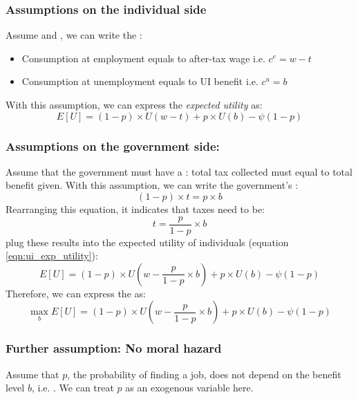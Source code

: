             \subsubsection{Assumptions on the individual side}
                Assume  and , we can write the :
                \begin{itemize}
                    \item Consumption at employment equals to after-tax wage i.e. $c^e = w-t$
                    \item Consumption at unemployment equals to UI benefit i.e. $c^u = b$
                \end{itemize}
                With this assumption, we can express the \emph{expected utility} as:
                \begin{equation}
                    E[U] = (1-p)\times{U(w-t)} + p\times{U(b)} - \psi(1-p)
                    \label{eqn:ui_exp_utility}
                \end{equation}
                
            \subsubsection{Assumptions on the government side:}
                Assume that the government must have a : total tax collected must equal to total benefit given. With this assumption, we can write the government's :
                $$(1-p)\times{t} = p\times{b}$$
                Rearranging this equation, it indicates that taxes need to be:
                $$t = \frac{p}{1-p}\times{b}$$
                plug these results into the expected utility of individuals (equation \ref{eqn:ui_exp_utility}):
                $$E[U] = (1-p)\times{U(w-\frac{p}{1-p}\times{b})} + p\times{U(b)} - \psi(1-p)$$
                Therefore, we can express the  as:
                \begin{equation}
                    \label{eqn:ui_no_mh}
                    \max_{b} E[U] = (1-p)\times{U(w-\frac{p}{1-p}\times{b})} + p\times{U(b)} - \psi(1-p)
                    \end{equation}
                    
            \subsubsection{Further assumption: No moral hazard}
                Assume that $p$, the probability of finding a job, does not depend on the benefit level $b$, i.e. . We can treat $p$ as an exogenous variable here.
                
